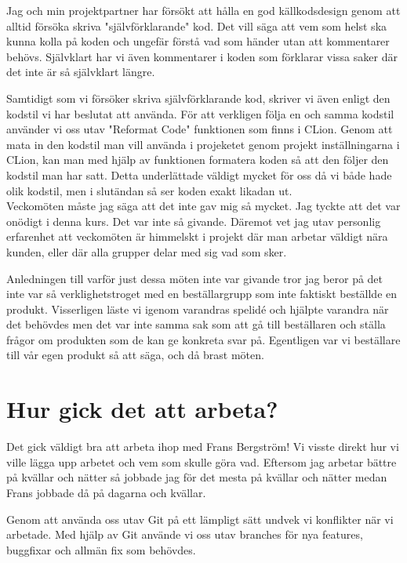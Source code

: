 \documentclass{template}
\begin{document}
Jag och min projektpartner har försökt att hålla en god källkodsdesign genom att alltid försöka skriva "självförklarande" kod. Det vill säga att vem som helst ska kunna kolla på koden och ungefär förstå vad som händer utan att kommentarer behövs. Självklart har vi även kommentarer i koden som förklarar vissa saker där det inte är så självklart längre.

Samtidigt som vi försöker skriva självförklarande kod, skriver vi även enligt den kodstil vi har beslutat att använda. För att verkligen följa en och samma kodstil använder vi oss utav "Reformat Code" funktionen som finns i CLion. Genom att mata in den kodstil man vill använda i projeketet genom projekt inställningarna i CLion, kan man med hjälp av funktionen formatera koden så att den följer den kodstil man har satt. Detta underlättade väldigt mycket för oss då vi både hade olik kodstil, men i slutändan så ser koden exakt likadan ut.\\

Veckomöten måste jag säga att det inte gav mig så mycket. Jag tyckte att det var onödigt i denna kurs. Det var inte så givande. Däremot vet jag utav personlig erfarenhet att veckomöten är himmelskt i projekt där man arbetar väldigt nära kunden, eller där alla grupper delar med sig vad som sker.

Anledningen till varför just dessa möten inte var givande tror jag beror på det inte var så verklighetstroget med en beställargrupp som inte faktiskt beställde en produkt. Visserligen läste vi igenom varandras spelidé och hjälpte varandra när det behövdes men det var inte samma sak som att gå till beställaren och ställa frågor om produkten som de kan ge konkreta svar på. Egentligen var vi beställare till vår egen produkt så att säga, och då brast möten.\\

\section{Hur gick det att arbeta?}
Det gick väldigt bra att arbeta ihop med Frans Bergström! Vi visste direkt hur vi ville lägga upp arbetet och vem som skulle göra vad. Eftersom jag arbetar bättre på kvällar och nätter så jobbade jag för det mesta på kvällar och nätter medan Frans jobbade då på dagarna och kvällar.

Genom att använda oss utav Git på ett lämpligt sätt undvek vi konflikter när vi arbetade. Med hjälp av Git använde vi oss utav branches för nya features, buggfixar och allmän fix som behövdes. \\
\end{document}
